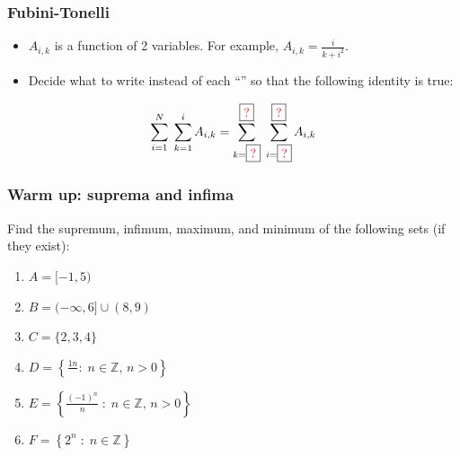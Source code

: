 \documentclass[14pt]{beamer}
\newcommand{\rojo}[1]{{\color{red} #1}}
\newcommand{\cajar}[1]{\boxed{\mbox{\rojo{ #1}}}}
\newcommand{\majar}[1]{\boxed{\rojo{ #1}}}
\newcommand{\setsize}[1]{\fontsize{#1}{#1}\selectfont} %
\newcommand{\smallerfont}{\setsize{13}} %
\begin{document}
	\begin{frame}[t]
		\smallerfont
		\frametitle{Fubini-Tonelli}

		\begin{itemize}
			\item $A_{i,k}$ is a function of 2 variables. \; For example, ${\displaystyle A_{i,k} = \frac{i}{k+i^{2}}}$.

			\item Decide what to write instead of each ``\cajar{?}'' so that the
				following identity is true:
		\end{itemize}

		{\setsize{20} \begin{equation*}\sum_{i=1}^{N}\; \sum_{k=1}^{i}A_{i, k}= \sum_{k = \majar{?}}^{\majar{?}}\; \sum_{i=\majar{?}}^{\majar{?}}A_{i,k}\end{equation*} }
	\end{frame}
	\begin{frame}[t]
		\smallerfont
		\frametitle{Warm up: suprema and infima}

		Find the supremum, infimum, maximum, and minimum of the following sets (if
		they exist):

		\begin{enumerate}
			\vfill

			\item ${\displaystyle A = [-1,5)}$
				\vfill

			\item ${\displaystyle B = (-\infty,6] \cup (8, 9)}$
				\vfill

			\item ${\displaystyle C = \{ 2, 3, 4\}}$
				\vfill

			\item ${\displaystyle  D = \left\{ \frac{1n}{\;} : \; n \in \mathbb{Z}, \, n >0 \right\} }$
				\vfill

			\item ${\displaystyle  E = \left\{ \frac{(-1)^{n}}{n} \; : \; n \in \mathbb{Z}, \, n >0 \right\} }$
				\vfill

			\item ${\displaystyle  F = \left\{ 2^n \; : \; n \in \mathbb{Z} \right\} }$
				\vfill
		\end{enumerate}
	\end{frame}
\end{document}
